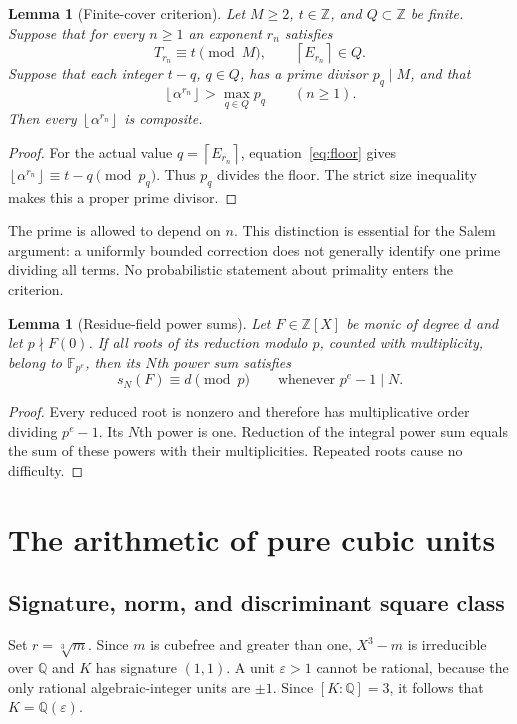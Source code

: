 \documentclass[11pt,a4paper]{article}
\newtheorem{lemma}[theorem]{Lemma}
\theoremstyle{definition}\newtheorem{definition}[theorem]{Definition}
\theoremstyle{remark}\newtheorem{remark}[theorem]{Remark}
\newcommand{\Q}{\mathbb Q}\newcommand{\Z}{\mathbb Z}\newcommand{\N}{\mathbb N}\newcommand{\R}{\mathbb R}\newcommand{\C}{\mathbb C}
\newcommand{\floor}[1]{\left\lfloor #1\right\rfloor}\newcommand{\ceil}[1]{\left\lceil #1\right\rceil}
\begin{document}
\begin{lemma}[Finite-cover criterion]\label{lem:cover}
Let $M\ge2$, $t\in\Z$, and $Q\subset\Z$ be finite. Suppose that for every $n\ge1$ an exponent $r_n$ satisfies
\[
 T_{r_n}\equiv t\pmod M,\qquad \ceil{E_{r_n}}\in Q.
\]
Suppose that each integer $t-q$, $q\in Q$, has a prime divisor $p_q\mid M$, and that
\[
 \floor{\alpha^{r_n}}>\max_{q\in Q}p_q\qquad(n\ge1).
\]
Then every $\floor{\alpha^{r_n}}$ is composite.
\end{lemma}
\begin{proof}
For the actual value $q=\ceil{E_{r_n}}$, equation~\eqref{eq:floor} gives
$\floor{\alpha^{r_n}}\equiv t-q\pmod {p_q}$. Thus $p_q$ divides the floor. The strict size inequality makes this a proper prime divisor.
\end{proof}

The prime is allowed to depend on $n$. This distinction is essential for the Salem argument: a uniformly bounded correction does not generally identify one prime dividing all terms. No probabilistic statement about primality enters the criterion.

\begin{lemma}[Residue-field power sums]\label{lem:residue}
Let $F\in\Z[X]$ be monic of degree $d$ and let $p\nmid F(0)$. If all roots of its reduction modulo $p$, counted with multiplicity, belong to $\mathbb F_{p^e}$, then its $N$th power sum satisfies
\[
 s_N(F)\equiv d\pmod p\qquad\text{whenever }p^e-1\mid N.
\]
\end{lemma}
\begin{proof}
Every reduced root is nonzero and therefore has multiplicative order dividing $p^e-1$. Its $N$th power is one. Reduction of the integral power sum equals the sum of these powers with their multiplicities. Repeated roots cause no difficulty.
\end{proof}

\section{The arithmetic of pure cubic units}
\subsection{Signature, norm, and discriminant square class}
Set $r=\sqrt[3]{m}$. Since $m$ is cubefree and greater than one, $X^3-m$ is irreducible over $\Q$ and $K$ has signature $(1,1)$. A unit $\varepsilon>1$ cannot be rational, because the only rational algebraic-integer units are $\pm1$. Since $[K:\Q]=3$, it follows that $K=\Q(\varepsilon)$.
\end{document}
